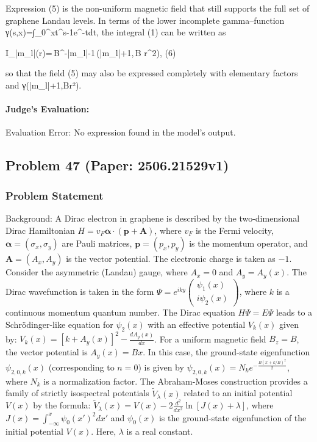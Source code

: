 \documentclass[10pt]{article}
\begin{document}
Expression (5) is the non-uniform magnetic field that still supports the full set of graphene Landau levels.  In terms of the lower incomplete gamma–function  
γ(s,x)=∫_{0}^{x}t^{s-1}e^{-t}dt, the integral (1) can be written as  

I_{|m_l|}(r)=\,B^{-|m_l|-1}\,\gamma\!\left(|m_l|+1,\,B r^{2}\right),   (6)

so that the field (5) may also be expressed completely with elementary factors and γ(|m_l|+1,Br²).

\paragraph*{Judge's Evaluation:}

Evaluation Error: No \boxed{} expression found in the model's output.

\newpage
\subsection*{Problem 47 (Paper: 2506.21529v1)}
\subsubsection*{Problem Statement}
Background:
A Dirac electron in graphene is described by the two-dimensional Dirac Hamiltonian \(H = v_F \mathbf{\alpha} \cdot (\mathbf{p} + \mathbf{A})\), where \(v_F\) is the Fermi velocity, \(\mathbf{\alpha} = (\sigma_x, \sigma_y)\) are Pauli matrices, \(\mathbf{p} = (p_x, p_y)\) is the momentum operator, and \(\mathbf{A} = (A_x, A_y)\) is the vector potential. The electronic charge is taken as \(-1\).
Consider the asymmetric (Landau) gauge, where \(A_x = 0\) and \(A_y = A_y(x)\). The Dirac wavefunction is taken in the form \(\Psi = e^{iky} \begin{pmatrix} \psi_1(x) \\ i \psi_2(x) \end{pmatrix}\), where \(k\) is a continuous momentum quantum number.
The Dirac equation \(H \Psi = E \Psi\) leads to a Schr\"odinger-like equation for \(\psi_2(x)\) with an effective potential \(V_k(x)\) given by:
\(V_k(x) = [k + A_y(x)]^2 - \frac{dA_y(x)}{dx}\).
For a uniform magnetic field \(B_z = B\), the vector potential is \(A_y(x) = Bx\). In this case, the ground-state eigenfunction \(\psi_{2,0,k}(x)\) (corresponding to \(n=0\)) is given by \(\psi_{2,0,k}(x) = N_k e^{-\frac{B (x + k/B)^2}{2}}\), where \(N_k\) is a normalization factor.
The Abraham-Moses construction provides a family of strictly isospectral potentials \(\tilde{V}_\lambda(x)\) related to an initial potential \(V(x)\) by the formula:
\( \tilde{V}_\lambda(x) = V(x) - 2 \frac{d^2}{dx^2} \ln [J(x) + \lambda] \),
where \(J(x) = \int_{-\infty}^x \psi_0(x')^2 dx'\) and \(\psi_0(x)\) is the ground-state eigenfunction of the initial potential \(V(x)\). Here, \(\lambda\) is a real constant.
\end{document}
